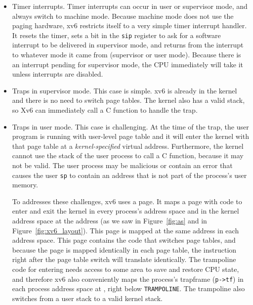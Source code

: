 \begin{itemize}
  
\item Timer interrupts.  Timer interrupts can occur in user
  or supervisor mode, and always switch to machine mode.
  Because machine mode does not use the paging hardware,
  xv6 restricts itself to a very simple timer interrupt handler.
  It resets the
  timer, sets a bit in the \lstinline{sip} register to ask
  for a software interrupt to be delivered in supervisor mode,
  and returns from the
  interrupt to whatever mode it came from (supervisor or user mode).
  Because there is an interrupt pending for supervisor mode, the
  CPU immediately will take it unless interrupts are disabled.

\item Traps in supervisor mode.  This case is simple. xv6
  is already in the kernel and there is no need to switch page
  tables. The kernel also has a valid stack, so Xv6 can immediately
  call a C function to handle the trap.

\item Traps in user mode. This case is challenging.  At the time
  of the trap, the user program is running with user-level page
  table and it will enter the kernel with that page table at a
  \textit{kernel-specified} virtual address. Furthermore, the kernel
  cannot use the stack of the user process to call a C function,
  because it may not be valid.  The user process may be malicious or
  contain an error that causes the user \texttt{sp} to contain an
  address that is not part of the process's user memory.

  To addresses these challenges, xv6 uses a 
  page.  It maps a page with code to enter and exit the kernel in
  every process's address space and in the kernel address space at the
  address  (as we saw in Figure~\ref{fig:as} and
  in Figure~\ref{fig:xv6_layout}).  This page is mapped at the same
  address in each address space.  This page contains the code that
  switches page tables, and because the page is mapped identically in
  each page table, the instruction right after the page table switch
  will translate identically.  The trampoline code for entering needs
  access to some area to save and restore CPU state, and therefore xv6
  also conveniently maps the process's trapframe (\lstinline{p->tf})
  in each process address space at , right below
  \lstinline{TRAMPOLINE}.  The trampoline also switches from a user
  stack to a valid kernel stack.

\end{itemize}


